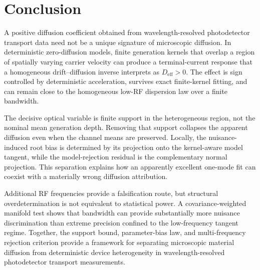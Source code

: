 \documentclass[aps,pra,twocolumn,superscriptaddress,nofootinbib]{revtex4-2}
\newcommand{\Deff}{D_{\mathrm{eff}}}
\begin{document}
\section{Conclusion}

A positive diffusion coefficient obtained from wavelength-resolved photodetector transport data need not be a unique signature of microscopic diffusion. In deterministic zero-diffusion models, finite generation kernels that overlap a region of spatially varying carrier velocity can produce a terminal-current response that a homogeneous drift--diffusion inverse interprets as $\Deff>0$. The effect is sign controlled by deterministic acceleration, survives exact finite-kernel fitting, and can remain close to the homogeneous low-RF dispersion law over a finite bandwidth.

The decisive optical variable is finite support in the heterogeneous region, not the nominal mean generation depth. Removing that support collapses the apparent diffusion even when the channel means are preserved. Locally, the nuisance-induced root bias is determined by its projection onto the kernel-aware model tangent, while the model-rejection residual is the complementary normal projection. This separation explains how an apparently excellent one-mode fit can coexist with a materially wrong diffusion attribution.

Additional RF frequencies provide a falsification route, but structural overdetermination is not equivalent to statistical power. A covariance-weighted manifold test shows that bandwidth can provide substantially more nuisance discrimination than extreme precision confined to the low-frequency tangent regime. Together, the support bound, parameter-bias law, and multi-frequency rejection criterion provide a framework for separating microscopic material diffusion from deterministic device heterogeneity in wavelength-resolved photodetector transport measurements.



\end{document}
